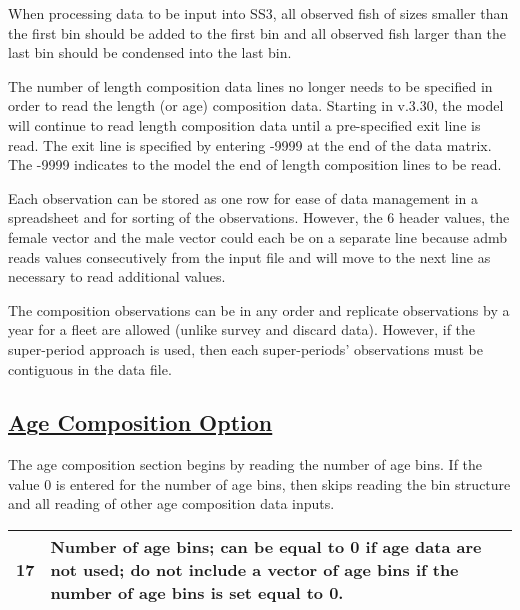 When processing data to be input into SS3, all observed fish of sizes smaller than the first bin should be added to the first bin and all observed fish larger than the last bin should be condensed into the last bin.	

The number of length composition data lines no longer needs to be specified in order to read the length (or age) composition data. Starting in v.3.30, the model will continue to read length composition data until a pre-specified exit line is read. The exit line is specified by entering -9999 at the end of the data matrix. The -9999 indicates to the model the end of length composition lines to be read.

Each observation can be stored as one row for ease of data management in a spreadsheet and for sorting of the observations. However, the 6 header values, the female vector and the male vector could each be on a separate line because \gls{admb} reads values consecutively from the input file and will move to the next line as necessary to read additional values.

The composition observations can be in any order and replicate observations by a year for a fleet are allowed (unlike survey and discard data). However, if the super-period approach is used, then each super-periods' observations must be contiguous in the data file.

\hypertarget{AgeCompOption}{}
\subsection[Age Composition Option]{\protect\hyperlink{AgeCompOption}{Age Composition Option}}
The age composition section begins by reading the number of age bins. If the value 0 is entered for the number of age bins, then skips reading the bin structure and all reading of other age composition data inputs.
\begin{center}
	\vspace*{-\baselineskip}
	\begin{tabular}{p{3cm} p{13cm}}
		\hline
		17 \Tstrut & Number of age bins; can be equal to 0 if age data are not used; do not include a vector of age bins if the number of age bins is set equal to 0. \Bstrut\\
		\hline
	\end{tabular}
\end{center}

\hypertarget{AgeCompBins}{}
